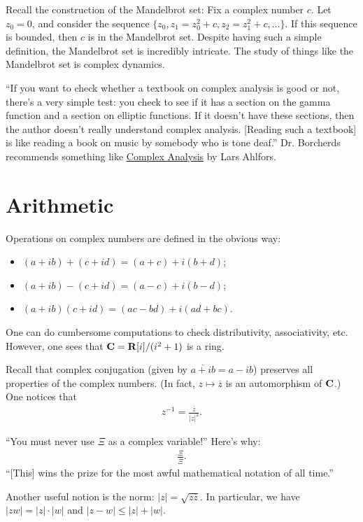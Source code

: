 \documentclass[11pt, oneside,margin=1in]{article}
\begin{document}
Recall the construction of the Mandelbrot set: Fix a complex number $c$. Let $z_0=0$, and consider the sequence $\{z_0, z_1 = z_0^2 + c, z_2 = z_1^2 + c,\hdots\}$. If this sequence is bounded, then $c$ is in the Mandelbrot set. Despite having such a simple definition, the Mandelbrot set is incredibly intricate. The study of things like the Mandelbrot set is complex dynamics.

``If you want to check whether a textbook on complex analysis is good or not, there's a very simple test: you check to see if it has a section on the gamma function and a section on elliptic functions. If it doesn't have these sections, then the author doesn't really understand complex analysis. [Reading such a textbook] is like reading a book on music by somebody who is tone deaf.'' Dr. Borcherds recommends something like \underline{Complex Analysis} by Lars Ahlfors. 

\section{Arithmetic}
Operations on complex numbers are defined in the obvious way:
\begin{itemize}
	\item $(a+ib) +  (c+id) =  (a+c) + i (b+d)$;
	\item $(a+ib) - (c+id) =  (a-c) + i (b-d)$;
	\item $(a+ib) (c+id) =  (ac - bd) + i (ad + bc)$.
\end{itemize}

One can do cumbersome computations to check distributivity, associativity, etc. However, one sees that $\mathbf C = \mathbf R[i]/(i^2+1)$ is a ring.

Recall that complex conjugation (given by $\overline{a+ib} = a-ib$) preserves all properties of the complex numbers. (In fact, $z\mapsto \overline{z}$ is an automorphism of $\mathbf C$.) One notices that 
\begin{align*}
	z^{-1} = \frac{\overline{z}}{\left\lvert z \right\rvert ^2}.
\end{align*}

``You must never use $\Xi$ as a complex variable!'' Here's why:
\begin{align*}
	\frac{\Xi}{\overline{\Xi}}.
\end{align*}
``[This] wins the prize for the most awful mathematical notation of all time.''

Another useful notion is the norm: $\left\lvert z \right\rvert =\sqrt{z\overline{z}} $. In particular, we have $\left\lvert zw \right\rvert = \left\lvert z \right\rvert \cdot \left\lvert w \right\rvert$ and $\left\lvert z-w \right\rvert \le \left\lvert z \right\rvert +\left\lvert w \right\rvert $.
\end{document}
